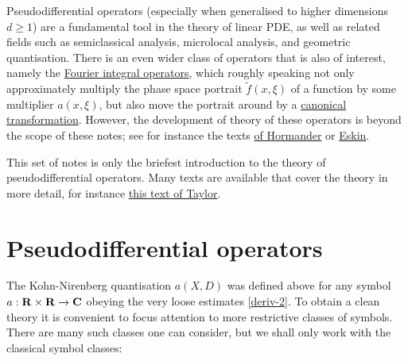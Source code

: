 \documentclass[11pt]{article}
\theoremstyle{definition}
\theoremstyle{remark}
\begin{document}
Pseudodifferential operators (especially when generalised to higher dimensions \({d \geq 1}\)) are a fundamental tool in the theory of linear PDE, as well as related fields such as semiclassical analysis, microlocal analysis, and geometric quantisation. There is an even wider class of operators that is also of interest, namely the \href{https://en.wikipedia.org/wiki/Fourier_integral_operator}{Fourier integral operators}, which roughly speaking not only approximately multiply the phase space portrait \({\tilde f(x,\xi)}\) of a function by some multiplier \({a(x,\xi)}\), but also move the portrait around by a \href{https://en.wikipedia.org/wiki/Canonical_transformation}{canonical transformation}. However, the development of theory of these operators is beyond the scope of these notes; see for instance the texts \href{https://mathscinet.ams.org/mathscinet-getitem?mr=1481433}{of Hormander} or \href{https://mathscinet.ams.org/mathscinet-getitem?mr=2809923}{Eskin}.



This set of notes is only the briefest introduction to the theory of pseudodifferential operators. Many texts are available that cover the theory in more detail, for instance \href{https://mathscinet.ams.org/mathscinet-getitem?mr=1766415}{this text of Taylor}.






\section{Pseudodifferential operators}

The Kohn-Nirenberg quantisation \({a(X,D)}\) was defined above for any symbol \({a: {\bf R} \times {\bf R} \rightarrow {\bf C}}\) obeying the very loose estimates \eqref{deriv-2}. To obtain a clean theory it is convenient to focus attention to more restrictive classes of symbols. There are many such classes one can consider, but we shall only work with the classical symbol classes:
\end{document}
